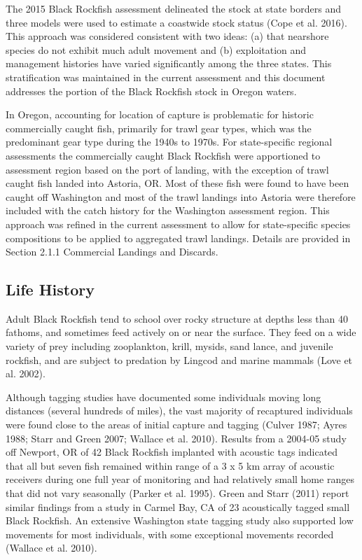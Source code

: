 \documentclass[11pt,
  english,
  letterpaper,
]{article}
\begin{document}
The 2015 Black Rockfish assessment delineated the stock at state borders and three models were used to estimate a coastwide stock status (Cope et al. 2016). This approach was considered consistent with two ideas: (a) that nearshore species do not exhibit much adult movement and (b) exploitation and management histories have varied significantly among the three states. This stratification was maintained in the current assessment and this document addresses the portion of the Black Rockfish stock in Oregon waters.

In Oregon, accounting for location of capture is problematic for historic commercially caught fish, primarily for trawl gear types, which was the predominant gear type during the 1940s to 1970s. For state-specific regional assessments the commercially caught Black Rockfish were apportioned to assessment region based on the port of landing, with the exception of trawl caught fish landed into Astoria, OR. Most of these fish were found to have been caught off Washington and most of the trawl landings into Astoria were therefore included with the catch history for the Washington assessment region. This approach was refined in the current assessment to allow for state-specific species compositions to be applied to aggregated trawl landings. Details are provided in Section 2.1.1 Commercial Landings and Discards.

\hypertarget{life-history}{%
\subsection{Life History}\label{life-history}}

Adult Black Rockfish tend to school over rocky structure at depths less than 40 fathoms, and sometimes feed actively on or near the surface. They feed on a wide variety of prey including zooplankton, krill, mysids, sand lance, and juvenile rockfish, and are subject to predation by Lingcod and marine mammals (Love et al. 2002).

Although tagging studies have documented some individuals moving long distances (several hundreds of miles), the vast majority of recaptured individuals were found close to the areas of initial capture and tagging (Culver 1987; Ayres 1988; Starr and Green 2007; Wallace et al. 2010). Results from a 2004-05 study off Newport, OR of 42 Black Rockfish implanted with acoustic tags indicated that all but seven fish remained within range of a 3 x 5 km array of acoustic receivers during one full year of monitoring and had relatively small home ranges that did not vary seasonally (Parker et al. 1995). Green and Starr (2011) report similar findings from a study in Carmel Bay, CA of 23 acoustically tagged small Black Rockfish. An extensive Washington state tagging study also supported low movements for most individuals, with some exceptional movements recorded (Wallace et al. 2010).
\end{document}
